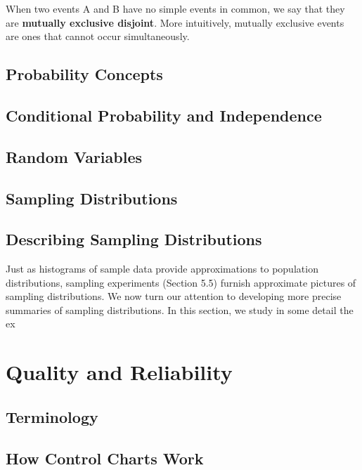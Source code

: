 \documentclass{article}
\begin{document}
	When two events A and B have no simple events in common, we say that they are 
	\textbf{mutually exclusive  disjoint}. More intuitively, mutually exclusive events are ones 
	that cannot occur simultaneously.

	\subsection{Probability Concepts} %
	
	\subsection{Conditional Probability and Independence} %
	
	\subsection{Random Variables} %
	
	\subsection{Sampling Distributions} %
	
	\subsection{Describing Sampling Distributions} %
	Just as histograms of sample data provide approximations to population distributions, sampling experiments (Section 5.5) furnish approximate pictures of sampling distributions. We now turn our attention to developing more precise summaries of sampling distributions. In this section, we study in some detail the ex

\clearpage	 %
\section{Quality and Reliability} %

	\subsection{Terminology} %
	
	\subsection{How Control Charts Work} %
	
\end{document}
